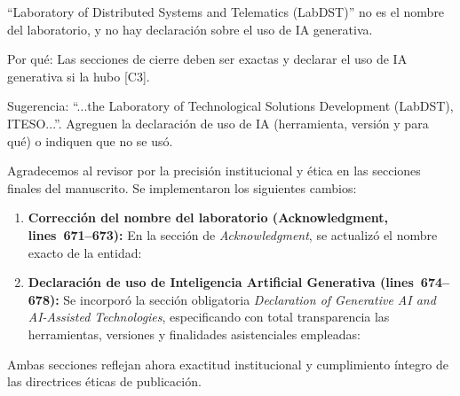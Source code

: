 \documentclass{LabDSTresponse}
\begin{document}
{“Laboratory of Distributed Systems and Telematics (LabDST)” no es el nombre del laboratorio, y no hay declaración sobre el uso de IA generativa.

Por qué: Las secciones de cierre deben ser exactas y declarar el uso de IA generativa si la hubo [C3].

Sugerencia: “...the Laboratory of Technological Solutions Development (LabDST), ITESO...”. Agreguen la declaración de uso de IA (herramienta, versión y para qué) o indiquen que no se usó.}
{Agradecemos al revisor por la precisión institucional y ética en las secciones finales del manuscrito. Se implementaron los siguientes cambios:
\begin{enumerate}
    \item \textbf{Corrección del nombre del laboratorio (Acknowledgment, lines~671--673):} En la sección de \textit{Acknowledgment}, se actualizó el nombre exacto de la entidad:
    \item \textbf{Declaración de uso de Inteligencia Artificial Generativa (lines~674--678):} Se incorporó la sección obligatoria \textit{Declaration of Generative AI and AI-Assisted Technologies}, especificando con total transparencia las herramientas, versiones y finalidades asistenciales empleadas:
\end{enumerate}
Ambas secciones reflejan ahora exactitud institucional y cumplimiento íntegro de las directrices éticas de publicación.}
\end{document}
